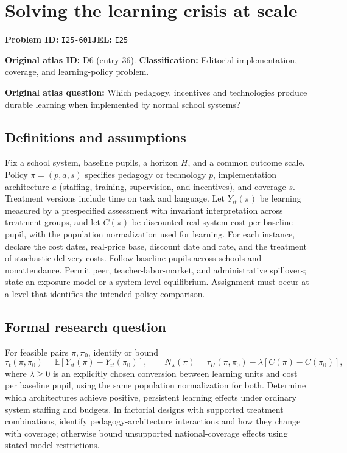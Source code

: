 \documentclass[11pt,a4paper]{article}
\begin{document}
\section*{Solving the learning crisis at scale}
\textbf{Problem ID:} \texttt{I25-601}\quad \textbf{JEL:} \texttt{I25}\par
\label{problem:OP-0036}
\label{audited:ECON-044}
\label{audited:ECON-045}

\label{atlas:prob:D6}
\noindent\textbf{Original atlas ID:} D6 (entry 36). \textbf{Classification:} Editorial implementation, coverage, and learning-policy problem.

\noindent\textbf{Original atlas question:} Which pedagogy, incentives and technologies produce durable learning when implemented by normal school systems?

\subsection*{Definitions and assumptions}
Fix a school system, baseline pupils, a horizon $H$, and a common outcome scale. Policy $\pi=(p,a,s)$ specifies pedagogy or technology $p$, implementation architecture $a$ (staffing, training, supervision, and incentives), and coverage $s$. Treatment versions include time on task and language. Let $Y_{it}(\pi)$ be learning measured by a prespecified assessment with invariant interpretation across treatment groups, and let $C(\pi)$ be discounted real system cost per baseline pupil, with the population normalization used for learning. For each instance, declare the cost dates, real-price base, discount date and rate, and the treatment of stochastic delivery costs. Follow baseline pupils across schools and nonattendance. Permit peer, teacher-labor-market, and administrative spillovers; state an exposure model or a system-level equilibrium. Assignment must occur at a level that identifies the intended policy comparison.
\subsection*{Formal research question}
For feasible pairs $\pi,\pi_0$, identify or bound
\[
 \tau_t(\pi,\pi_0)=\mathbb E[Y_{it}(\pi)-Y_{it}(\pi_0)],
 \qquad
 N_{\lambda}(\pi)=\tau_H(\pi,\pi_0)
                         -\lambda[C(\pi)-C(\pi_0)],
\]
where $\lambda\geq0$ is an explicitly chosen conversion between learning units and cost per baseline pupil, using the same population normalization for both. Determine which architectures achieve positive, persistent learning effects under ordinary system staffing and budgets. In factorial designs with supported treatment combinations, identify pedagogy-architecture interactions and how they change with coverage; otherwise bound unsupported national-coverage effects using stated model restrictions.
\end{document}
